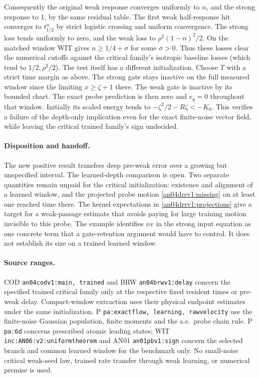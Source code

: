 \documentclass[11pt]{article}
\begin{document}
Consequently the original weak response converges uniformly to $n$,
and the strong response to $1$, by the same residual table. The first
weak half-response hit converges to $t_{1/2}^{n}$ by strict logistic
crossing and uniform convergence. The strong loss tends uniformly
to zero, and the weak loss to $\rho^2(1-n)^2/2$. On the matched
window WIT gives $n\ge1/4+\sigma$ for some $\sigma>0$.
Thus these losses clear the numerical cutoffs against the critical
family's isotropic baseline losses (which tend to $1/2,\rho^2/2$).
The test itself has a different initialization. Choose $T$ with a
strict time margin as above. The strong gate stays inactive on the
full measured window since the limiting $x\ge\zeta+1$ there. The
weak gate is inactive by its bounded chart. The exact probe prediction
is then zero and $e_q=0$ throughout that window. Initially its
scaled energy tends to $-\zeta^2/2-R\zeta<-K_0$. This verifies a
failure of the depth-only implication even for the exact finite-noise
vector field, while leaving the critical trained family's sign undecided.

\paragraph{Disposition and handoff.}
The new positive result transfers deep pre-weak error over a growing
but unspecified interval. The learned-depth comparison is open.
Two separate quantities remain unpaid for the critical initialization:
existence and alignment of a learned window, and the projected
probe motion \eqref{an04drrv1:missing} on at least one reached
time there. The kernel expectations in \eqref{an04drrv1:projections}
give a target for a weak-passage estimate that avoids paying for
large training motion invisible to this probe. The example identifies
$nv$ in the strong input equation as one concrete term that a
gate-retention argument would have to control. It does not establish
its size on a trained learned window.

\paragraph{Source ranges.}\raggedright
COD \texttt{an04codv1:main, trained} and BRW \texttt{an04brwv1:delay}
concern the specified trained critical family only at the respective
fixed resident times or pre-weak delay. Compact-window extraction
uses their physical endpoint estimates under the same initialization.
P \texttt{pa:exactflow, learning, rawvelocity} use the finite-noise
Gaussian population, finite moments and the a.e.\ probe chain rule.
P \texttt{pa:6d} concerns prescribed atomic leading states;
WIT \texttt{inc:AN06:v2:uniformtheorem} and
AN01 \texttt{an01pbv1:sign} concern the selected branch and common
learned window for the benchmark only. No small-noise critical
weak-seed law, trained rate transfer through weak learning, or
numerical premise is used.
\end{document}
